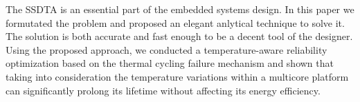 The SSDTA is an essential part of the embedded systems design. In this paper we formutated the problem and proposed an elegant anlytical technique to solve it. The solution is both accurate and fast enough to be a decent tool of the designer. Using the proposed approach, we conducted a temperature-aware reliability optimization based on the thermal cycling failure mechanism and shown that taking into consideration the temperature variations within a multicore platform can significantly prolong its lifetime without affecting its energy efficiency.
